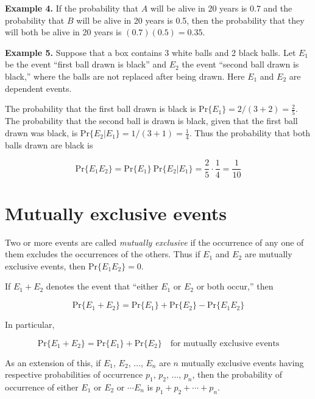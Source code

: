 \documentclass[
]{article}
\begin{document}
\textbf{Example 4.} If the probability that \(A\) will be alive in 20
years is 0.7 and the probability that \(B\) will be alive in 20 years is
0.5, then the probability that they will both be alive in 20 years is
\((0.7)(0.5) = 0.35\).

\textbf{Example 5.} Suppose that a box contains 3 white balls and 2
black balls. Let \(E_1\) be the event ``first ball drawn is black'' and
\(E_2\) the event ``second ball drawn is black,'' where the balls are
not replaced after being drawn. Here \(E_1\) and \(E_2\) are dependent
events.

The probability that the first ball drawn is black is
\(\text{Pr}\{E_1\} = 2 / (3 + 2) = \frac{2}{5}\). The probability that
the second ball is drawn is black, given that the first ball drawn was
black, is \(\text{Pr}\{E_2|E_1\} = 1 / (3 + 1) = \frac{1}{4}\). Thus the
probability that both balls drawn are black is

\[
\text{Pr}\{E_1 E_2\} = \text{Pr}\{E_1\}\ \text{Pr}\{E_2|E_1\}
= \frac{2}{5} \cdot \frac{1}{4} = \frac{1}{10}
\]

\hypertarget{mutually-exclusive-events}{%
\section{Mutually exclusive events}\label{mutually-exclusive-events}}

Two or more events are called \emph{mutually exclusive} if the
occurrence of any one of them excludes the occurrences of the others.
Thus if \(E_1\) and \(E_2\) are mutually exclusive events, then
\(\text{Pr}\{E_1 E_2\} = 0\).

If \(E_1 + E_2\) denotes the event that ``either \(E_1\) or \(E_2\) or
both occur,'' then

\begin{equation}
\text{Pr}\{E_1 + E_2\} = \text{Pr}\{E_1\} + \text{Pr}\{E_2\}
  - \text{Pr}\{E_1 E_2\}
\end{equation}

In particular,

\begin{equation}
\text{Pr}\{E_1 + E_2\} = \text{Pr}\{E_1\} + \text{Pr}\{E_2\}
\ \ \ \text{ for mutually exclusive events}
\end{equation}

As an extension of this, if \(E_1\), \(E_2\), \(\ldots\), \(E_n\) are
\(n\) mutually exclusive events having respective probabilities of
occurrence \(p_1\), \(p_2\), \(\ldots\), \(p_n\), then the probability
of occurrence of either \(E_1\) or \(E_2\) or \(\cdots E_n\) is
\(p_1 + p_2 + \cdots + p_n\).
\end{document}
